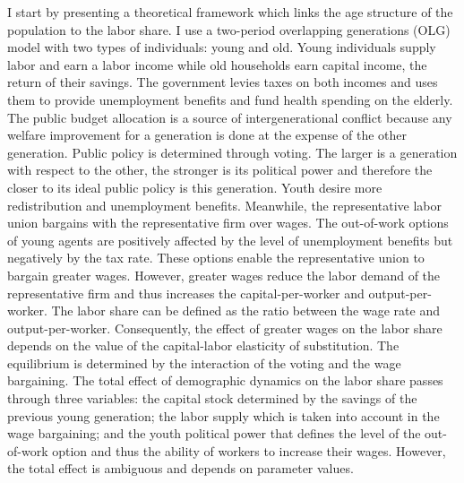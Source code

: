 I start by presenting a theoretical framework which links the age structure of the population to the labor share. I use a two-period overlapping generations (OLG) model with two types of individuals: young and old. Young individuals supply labor and earn a labor income while old households earn capital income, the return of their savings.
The government levies taxes on both incomes and uses them to provide unemployment benefits and fund health spending on the elderly. The public budget allocation is a source of intergenerational conflict because any welfare improvement for a generation is done at the expense of the other generation. Public policy is determined through voting. The larger is a generation with respect to the other, the stronger is its political power and therefore the closer to its ideal public policy is this generation. Youth desire more redistribution and unemployment benefits.
Meanwhile, the representative labor union bargains with the representative firm over wages. The out-of-work options of young agents are positively affected by the level of unemployment benefits but negatively by the tax rate. These options enable the representative union to bargain greater wages. However, greater wages reduce the labor demand of the representative firm and thus increases the capital-per-worker and output-per-worker. The labor share can be defined as the ratio between the wage rate and output-per-worker. Consequently, the effect of greater wages on the labor share depends on the value of the capital-labor elasticity of substitution.
The equilibrium is determined by the interaction of the voting and the wage bargaining. The total effect of demographic dynamics on the labor share passes through three variables: the capital stock determined by the savings of the previous young generation; the labor supply which is taken into account in the wage bargaining; and the youth political power that defines the level of the out-of-work option and thus the ability of workers to increase their wages. However, the total effect is ambiguous and depends on parameter values.


